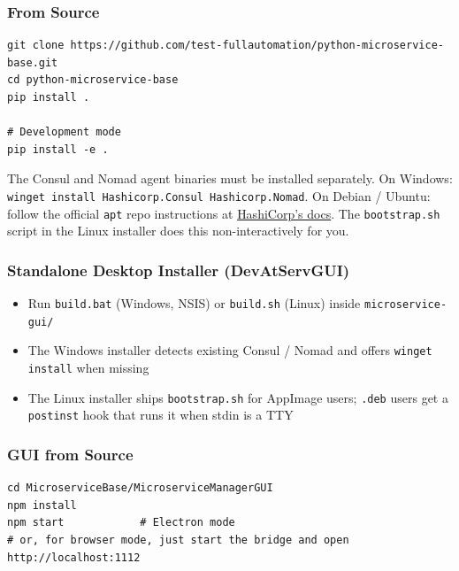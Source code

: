 \subsubsection{From Source}

\begin{verbatim}
git clone https://github.com/test-fullautomation/python-microservice-base.git
cd python-microservice-base
pip install .

# Development mode
pip install -e .
\end{verbatim}

\noindent
The Consul and Nomad agent binaries must be installed separately.  On Windows:
\texttt{winget install Hashicorp.Consul Hashicorp.Nomad}.  On Debian / Ubuntu:
follow the official \texttt{apt} repo instructions at \href{https://developer.hashicorp.com/well-architected-framework/install}{HashiCorp's
docs}.  The \texttt{bootstrap.sh} script in the Linux installer does this
non-interactively for you.

\subsubsection{Standalone Desktop Installer (DevAtServGUI)}

\begin{itemize}
   \item Run \texttt{build.bat} (Windows, NSIS) or \texttt{build.sh} (Linux) inside
         \texttt{microservice-gui/}
   \item The Windows installer detects existing Consul / Nomad and offers
         \texttt{winget install} when missing
   \item The Linux installer ships \texttt{bootstrap.sh} for AppImage users; \texttt{.deb}
         users get a \texttt{postinst} hook that runs it when stdin is a TTY
\end{itemize}

\subsubsection{GUI from Source}

\begin{verbatim}
cd MicroserviceBase/MicroserviceManagerGUI
npm install
npm start            # Electron mode
# or, for browser mode, just start the bridge and open http://localhost:1112
\end{verbatim}

